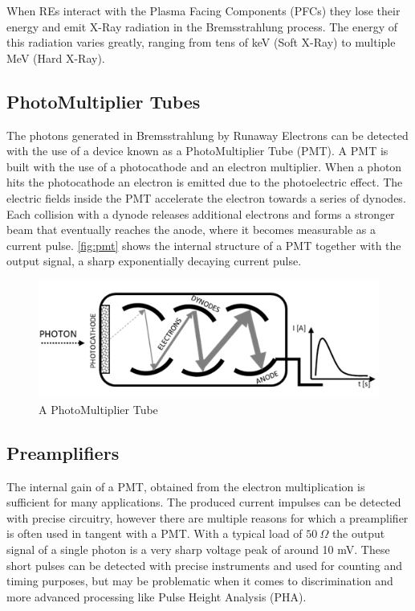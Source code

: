 When REs interact with the Plasma Facing Components (PFCs)
they lose their energy and emit X-Ray radiation in 
the Bremsstrahlung process. The energy of this radiation
varies greatly, ranging from tens of keV (Soft X-Ray)
to multiple MeV (Hard X-Ray).
\cite{hxrm_jet}

\subsection{PhotoMultiplier Tubes}

The photons generated in Bremsstrahlung by Runaway Electrons
can be detected with the use of a device known as a PhotoMultiplier Tube (PMT).
A PMT is built with the use of a photocathode and an electron multiplier.
When a photon hits the photocathode an electron is emitted
due to the photoelectric effect. The electric fields inside the PMT accelerate the 
electron towards a series of dynodes. Each collision with a dynode releases
additional electrons and forms a stronger beam that 
eventually reaches the anode, where it becomes measurable as a current pulse.
\autoref{fig:pmt} shows the internal structure of a PMT together with the output
signal, a sharp exponentially decaying current pulse.
\cite{pmts_basics, pmt_gain}
\begin{figure}[H]
  \centering
  \includegraphics[width=.7\linewidth]{media/pmt.png}
  \caption{A PhotoMultiplier Tube}
  \label{fig:pmt}
\end{figure}
\subsection{Preamplifiers}

The internal gain of a PMT, obtained from the electron multiplication
is sufficient for many applications. The produced current impulses 
can be detected with precise circuitry,
however there are multiple reasons for which
a preamplifier is often used in tangent with a PMT. With a typical
load of $50 \: \Omega$ the output signal of a single photon is
a very sharp voltage peak of around 10 mV.
These short pulses can be detected with precise instruments and used for counting 
and timing purposes, but may be problematic when it comes to discrimination and 
more advanced processing like Pulse Height Analysis (PHA).
\cite{why_pmt_need_amplifiers}



